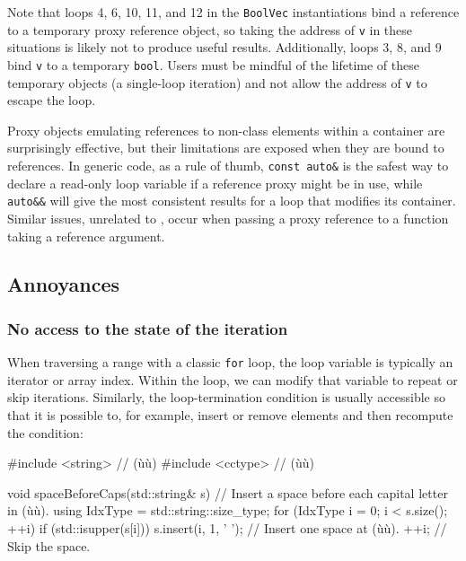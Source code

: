 {{{Note that loops 4, 6, 10, 11, and 12 in the \lstinline!BoolVec!
instantiations bind a reference to a temporary proxy reference object,
so taking the address of \lstinline!v! in these situations is likely not to
produce useful results. Additionally, loops 3, 8, and 9 bind \lstinline!v!
to a temporary \lstinline!bool!. Users must be mindful of the lifetime of
these temporary objects (a single-loop iteration) and not allow the
address of \lstinline!v! to escape the loop.

\noindent Proxy objects emulating references to non-class elements within a
container are surprisingly effective, but their limitations are exposed
when they are bound to references. In generic code, as a rule of thumb,
\lstinline!const!~\lstinline!auto&! is the safest way to declare a read-only
loop variable if a reference proxy might be in use, while
\lstinline!auto&&! will give the most consistent results for a loop that
modifies its container. Similar issues, unrelated to , occur when passing a proxy reference to a function
taking a reference argument.

\subsection[Annoyances]{Annoyances}\label{annoyances}

\subsubsection[No access to the state of the iteration]{No access to the state of the iteration}\label{no-access-to-the-state-of-the-iteration}

When traversing a range with a classic \lstinline!for! loop, the loop
variable is typically an iterator or array index. Within the loop, we
can modify that variable to repeat or skip iterations. Similarly, the
loop-termination condition is usually accessible so that it is possible
to, for example, insert or remove elements and then recompute the
condition:

\begin{emcppslisting}[emcppsbatch=e7]
#include <string>  // (ù{}ù)
#include <cctype>  // (ù{}ù)

void spaceBeforeCaps(std::string& s)
{
    // Insert a space before each capital letter in (ù{}ù).
    using IdxType = std::string::size_type;
    for (IdxType i = 0; i < s.size(); ++i)
    {
        if (std::isupper(s[i]))
        {
            s.insert(i, 1, ' ');  // Insert one space at (ù{}ù).
            ++i;                  // Skip the space.
        }
    }
}
\end{emcppslisting}
    

}}}
